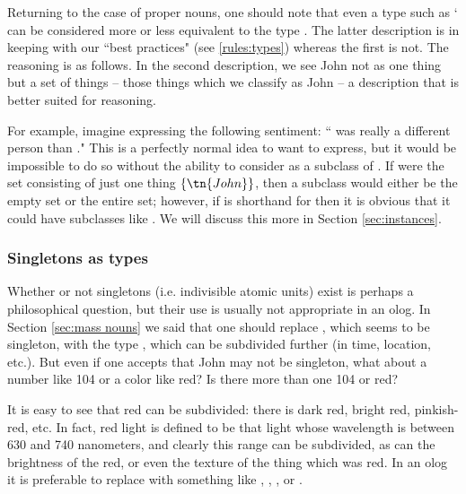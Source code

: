 {Returning to the case of proper nouns, one should note that even a type such as ` can be considered more or less equivalent to the type . The latter description is in keeping with our ``best practices" (see \ref{rules:types}) whereas the first is not.  The reasoning is as follows. In the second description, we see John not as one thing but a set of things -- those things which we classify as John -- a description that is better suited for reasoning. 

For example, imagine expressing the following sentiment: `` was really a different person than ."  This is a perfectly normal idea to want to express, but it would be impossible to do so without the ability to consider  as a subclass of . If  were the set consisting of just one thing $\{\tn{John}\}$, then a subclass would either be the empty set or the entire set; however, if  is shorthand for  then it is obvious that it could have subclasses like . We will discuss this more in Section \ref{sec:instances}.

\subsubsection{Singletons as types}

Whether or not singletons (i.e. indivisible atomic units) exist is perhaps a philosophical question, but their use is usually not appropriate in an olog. In Section \ref{sec:mass nouns} we said that one should replace , which seems to be singleton, with the type , which can be subdivided further (in time, location, etc.). But even if one accepts that John may not be singleton, what about a number like 104 or a color like red?  Is there more than one 104 or red?

It is easy to see that red can be subdivided: there is dark red, bright red, pinkish-red, etc. In fact, red light is defined to be that light whose wavelength is between 630 and 740 nanometers, and clearly this range can be subdivided, as can the brightness of the red, or even the texture of the thing which was red. In an olog it is preferable to replace  with something like , , , or . 

}
